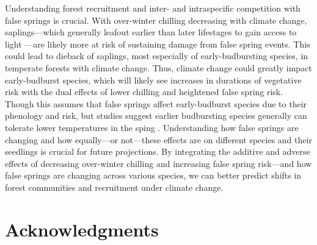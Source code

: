 \documentclass{article}\usepackage[]{graphicx}\usepackage[]{color}
\begin{document}
Understanding forest recruitment and inter- and intraspecific competition with false springs is crucial. With over-winter chilling decreasing with climate change, saplings---which generally leafout earlier than later lifestages to gain access to light \citep{Augspurger2009}---are likely more at risk of sustaining damage from false spring events. %
This could lead to dieback of saplings, most especially of early-budbursting species, in temperate forests with climate change. %
Thus, climate change could greatly impact early-budburst species, which will likely see increases in durations of vegetative risk with the dual effects of lower chilling and heightened false spring risk. Though this assumes that false springs affect early-budburst species due to their phenology and risk, but studies suggest earlier budbursting species generally can tolerate lower temperatures in the sping \citep{Lenz2013, Muffler2016}. Understanding how false springs are changing and how equally---or not---these effects are on different species and their seedlings is crucial for future projections. By integrating the additive and adverse effects of decreasing over-winter chilling and increasing false spring risk---and how false springs are changing across various species, we can better predict shifts in forest communities and recruitment under climate change. %

\section*{Acknowledgments}
\end{document}
